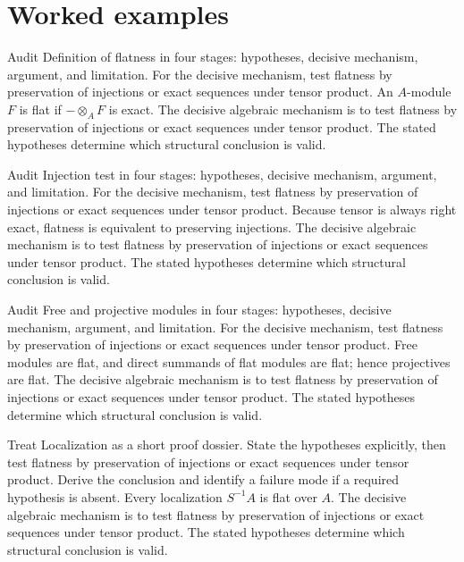 \section{Worked examples}

\begin{example}\label{ex:v14-worked-01}
Audit Definition of flatness in four stages: hypotheses, decisive mechanism, argument, and limitation. For the decisive mechanism, test flatness by preservation of injections or exact sequences under tensor product. An $A$-module $F$ is flat if $-\otimes_A F$ is exact. The decisive algebraic mechanism is to test flatness by preservation of injections or exact sequences under tensor product. The stated hypotheses determine which structural conclusion is valid.
\end{example}

\begin{example}\label{ex:v14-worked-02}
Audit Injection test in four stages: hypotheses, decisive mechanism, argument, and limitation. For the decisive mechanism, test flatness by preservation of injections or exact sequences under tensor product. Because tensor is always right exact, flatness is equivalent to preserving injections. The decisive algebraic mechanism is to test flatness by preservation of injections or exact sequences under tensor product. The stated hypotheses determine which structural conclusion is valid.
\end{example}

\begin{example}\label{ex:v14-worked-03}
Audit Free and projective modules in four stages: hypotheses, decisive mechanism, argument, and limitation. For the decisive mechanism, test flatness by preservation of injections or exact sequences under tensor product. Free modules are flat, and direct summands of flat modules are flat; hence projectives are flat. The decisive algebraic mechanism is to test flatness by preservation of injections or exact sequences under tensor product. The stated hypotheses determine which structural conclusion is valid.
\end{example}

\begin{example}\label{ex:v14-worked-04}
Treat Localization as a short proof dossier. State the hypotheses explicitly, then test flatness by preservation of injections or exact sequences under tensor product. Derive the conclusion and identify a failure mode if a required hypothesis is absent. Every localization $S^{-1}A$ is flat over $A$. The decisive algebraic mechanism is to test flatness by preservation of injections or exact sequences under tensor product. The stated hypotheses determine which structural conclusion is valid.
\end{example}

